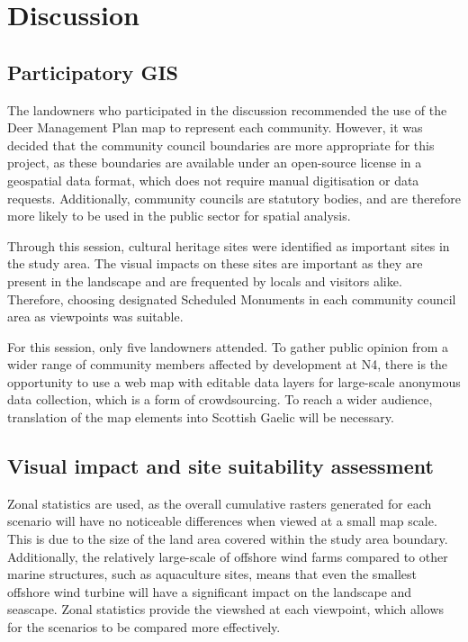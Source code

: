 \chapter{Discussion}

\section{Participatory GIS}

The landowners who participated in the discussion recommended the use of the
Deer Management Plan map to represent each community. However, it was decided
that the community council boundaries are more appropriate for this project, as
these boundaries are available under an open-source license in a geospatial
data format, which does not require manual digitisation or data requests.
Additionally, community councils are statutory bodies, and are therefore more
likely to be used in the public sector for spatial analysis.

Through this session, cultural heritage sites were identified as important
sites in the study area. The visual impacts on these sites are important as
they are present in the landscape and are frequented by locals and visitors
alike. Therefore, choosing designated Scheduled Monuments in each community
council area as viewpoints was suitable.

For this session, only five landowners attended. To gather public opinion from
a wider range of community members affected by development at N4, there is the
opportunity to use a web map with editable data layers for large-scale
anonymous data collection, which is a form of crowdsourcing. To reach a wider
audience, translation of the map elements into Scottish Gaelic will be
necessary.

\section{Visual impact and site suitability assessment}

Zonal statistics are used, as the overall cumulative rasters generated for each
scenario will have no noticeable differences when viewed at a small map scale.
This is due to the size of the land area covered within the study area
boundary. Additionally, the relatively large-scale of offshore wind farms
compared to other marine structures, such as aquaculture sites, means that even
the smallest offshore wind turbine will have a significant impact on the
landscape and seascape. Zonal statistics provide the viewshed at each
viewpoint, which allows for the scenarios to be compared more effectively.

